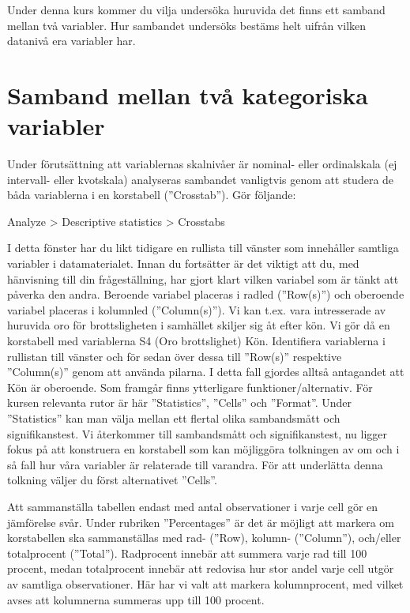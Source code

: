 \documentclass[
]{book}
\begin{document}
Under denna kurs kommer du vilja undersöka huruvida det finns ett samband mellan två variabler. Hur sambandet undersöks bestäms helt uifrån vilken datanivå era variabler har.

\hypertarget{samband-mellan-tvuxe5-kategoriska-variabler}{%
\section{Samband mellan två kategoriska variabler}\label{samband-mellan-tvuxe5-kategoriska-variabler}}

Under förutsättning att variablernas skalnivåer är nominal- eller ordinalskala (ej intervall- eller
kvotskala) analyseras sambandet vanligtvis genom att studera de båda variablerna i en korstabell (''Crosstab''). Gör följande:

Analyze \textgreater{} Descriptive statistics \textgreater{} Crosstabs

I detta fönster har du likt tidigare en rullista till vänster som innehåller samtliga variabler i
datamaterialet. Innan du fortsätter är det viktigt att du, med hänvisning till din frågeställning, har gjort klart vilken variabel som är tänkt att påverka den andra. Beroende variabel placeras i radled (''Row(s)'') och oberoende variabel placeras i kolumnled (''Column(s)''). Vi kan t.ex. vara intresserade av huruvida oro för brottsligheten i samhället skiljer sig åt efter kön. Vi gör då en korstabell med variablerna S4 (Oro brottslighet) Kön. Identifiera variablerna i rullistan till vänster och för sedan över dessa till ''Row(s)'' respektive ''Column(s)'' genom att använda pilarna. I detta fall gjordes alltså antagandet att Kön är
oberoende. Som framgår finns ytterligare funktioner/alternativ. För kursen relevanta rutor är här
''Statistics'', ''Cells'' och ''Format''. Under ''Statistics'' kan man välja mellan ett flertal olika
sambandsmått och signifikanstest. Vi återkommer till sambandsmått och signifikanstest, nu ligger
fokus på att konstruera en korstabell som kan möjliggöra tolkningen av om och i så fall hur våra
variabler är relaterade till varandra. För att underlätta denna tolkning väljer du först alternativet
''Cells''.

Att sammanställa tabellen endast med antal observationer i varje cell gör en jämförelse svår. Under
rubriken ''Percentages'' är det är möjligt att markera om korstabellen ska sammanställas med rad-
(''Row), kolumn- (''Column''), och/eller totalprocent (''Total''). Radprocent innebär att summera
varje rad till 100 procent, medan totalprocent innebär att redovisa hur stor andel varje cell utgör av
samtliga observationer. Här har vi valt att markera kolumnprocent, med vilket avses att kolumnerna
summeras upp till 100 procent.
\end{document}
